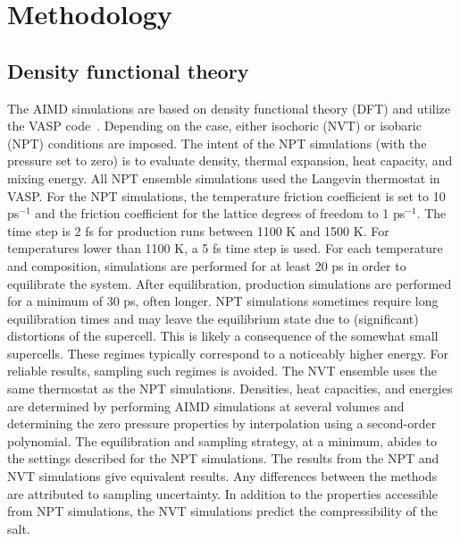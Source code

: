 \documentclass[preprint,3p,10pt,twocolumn,number,sort&compress]{elsarticle}
\begin{document}
\section{Methodology}
\label{sec:method}
\subsection{Density functional theory}
The AIMD simulations are based on density functional theory (DFT) and utilize the VASP code~\cite{Kresse1996}.
Depending on the case, either isochoric (NVT) or isobaric (NPT) conditions are imposed. The intent of the NPT simulations (with the pressure set to zero) is to evaluate density, thermal expansion, heat capacity, and mixing energy. All NPT ensemble simulations used the Langevin thermostat in VASP. For the NPT simulations, the temperature friction coefficient is set to 10 ps$^{-1}$ and the friction coefficient for the lattice degrees of freedom to 1 ps$^{-1}$. The time step is 2 fs for production runs between 1100 K and 1500 K. For temperatures lower than 1100 K, a 5 fs time step is used. 
For each temperature and composition, simulations are performed for at least 20 ps in order to equilibrate the system. 
After equilibration, production simulations are performed for a minimum of 30 ps, often longer. NPT simulations sometimes require long equilibration times and may leave the equilibrium state due to (significant) distortions of the supercell. This is likely a consequence of the somewhat small supercells. These regimes typically correspond to a noticeably higher energy. 
For reliable results, sampling such regimes is avoided. 
The NVT ensemble uses the same thermostat as the NPT simulations. Densities, heat capacities, and energies are determined by performing AIMD simulations at several volumes and determining the zero pressure properties by interpolation using a second-order polynomial. The equilibration and sampling strategy, at a minimum, abides to the settings described for the NPT simulations. The results from the NPT and NVT simulations give equivalent results. Any differences between the methods are attributed to sampling uncertainty. In addition to the properties accessible from NPT simulations, the NVT simulations predict the compressibility of the salt. 
\end{document}
